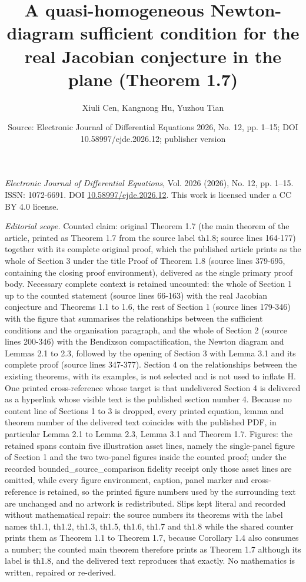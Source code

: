 \documentclass[10pt,a4paper]{amsart}
\title[A note on sufficient conditions for the real Jacobian conjecture in the plane]{A quasi-homogeneous Newton-diagram sufficient condition for the real Jacobian conjecture in the plane (Theorem 1.7)}
\author{Xiuli Cen, Kangnong Hu, Yuzhou Tian}
\date{Source: Electronic Journal of Differential Equations 2026, No. 12, pp. 1--15; DOI 10.58997/ejde.2026.12; publisher version}
\numberwithin{equation}{section}
\begin{document}
\maketitle
\noindent\emph{Electronic Journal of Differential Equations}, Vol. 2026 (2026), No. 12, pp. 1--15.\newline
ISSN: 1072-6691. DOI \href{https://doi.org/10.58997/ejde.2026.12}{10.58997/ejde.2026.12}. This work is licensed under a CC BY 4.0 license.\par\smallskip
\noindent\textit{Editorial scope.} Counted claim: original Theorem 1.7 (the main theorem of the article, printed as Theorem 1.7 from the source label th1.8; source lines 164-177) together with its complete original proof, which the published article prints as the whole of Section 3 under the title Proof of Theorem 1.8 (source lines 379-695, containing the closing proof environment), delivered as the single primary proof body. Necessary complete context is retained uncounted: the whole of Section 1 up to the counted statement (source lines 66-163) with the real Jacobian conjecture and Theorems 1.1 to 1.6, the rest of Section 1 (source lines 179-346) with the figure that summarises the relationships between the sufficient conditions and the organisation paragraph, and the whole of Section 2 (source lines 200-346) with the Bendixson compactification, the Newton diagram and Lemmas 2.1 to 2.3, followed by the opening of Section 3 with Lemma 3.1 and its complete proof (source lines 347-377). Section 4 on the relationships between the existing theorems, with its examples, is not selected and is not used to inflate H. One printed cross-reference whose target is that undelivered Section 4 is delivered as a hyperlink whose visible text is the published section number 4. Because no content line of Sections 1 to 3 is dropped, every printed equation, lemma and theorem number of the delivered text coincides with the published PDF, in particular Lemma 2.1 to Lemma 2.3, Lemma 3.1 and Theorem 1.7. Figures: the retained spans contain five illustration asset lines, namely the single-panel figure of Section 1 and the two two-panel figures inside the counted proof; under the recorded bounded\_source\_comparison fidelity receipt only those asset lines are omitted, while every figure environment, caption, panel marker and cross-reference is retained, so the printed figure numbers used by the surrounding text are unchanged and no artwork is redistributed. Slips kept literal and recorded without mathematical repair: the source numbers its theorems with the label names th1.1, th1.2, th1.3, th1.5, th1.6, th1.7 and th1.8 while the shared counter prints them as Theorem 1.1 to Theorem 1.7, because Corollary 1.4 also consumes a number; the counted main theorem therefore prints as Theorem 1.7 although its label is th1.8, and the delivered text reproduces that exactly. No mathematics is written, repaired or re-derived.
\end{document}
